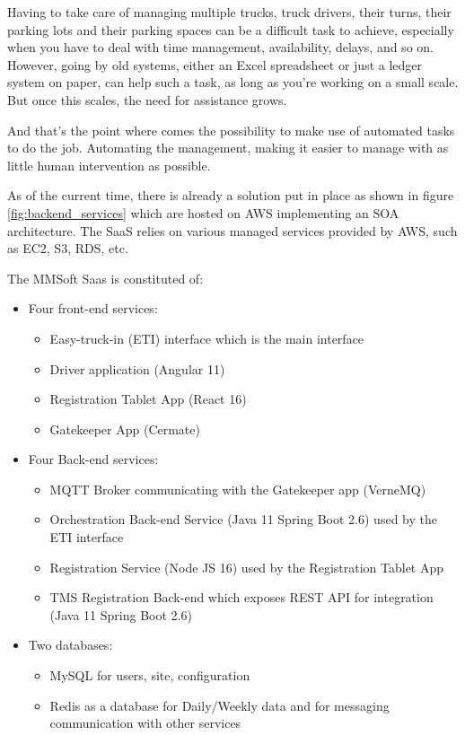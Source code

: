 Having to take care of managing multiple trucks, truck drivers, their turns, their parking lots
and their parking spaces can be a difficult task to achieve, especially when you have to deal with
time management, availability, delays, and so on.
However, going by old systems, either an Excel spreadsheet or just a ledger system on
paper, can help such a task, as long as you're working on a small scale. But once
this scales, the need for assistance grows.

And that's the point where comes the possibility to make use of automated tasks to do the job.
Automating the management, making it easier to manage with as little human intervention
as possible.

As of the current time, there is already a solution put in place as shown in figure
\ref{fig:backend_services} which are hosted  on AWS implementing an SOA architecture.
The SaaS relies on various managed services provided by AWS, such as EC2, S3, RDS, etc.

The MMSoft Saas is constituted of:
\begin{itemize}
    \item Four front-end services:
    \begin{itemize}
        \item Easy-truck-in (ETI) interface which is the main interface
        \item Driver application (Angular 11)
        \item Registration Tablet App (React 16)
        \item Gatekeeper App (Cermate)
    \end{itemize}
    \item Four Back-end services:
    \begin{itemize}
        \item MQTT Broker communicating with the Gatekeeper app (VerneMQ)
        \item Orchestration Back-end Service (Java 11 Spring Boot 2.6) used by the ETI interface
        \item Registration Service (Node JS 16) used by the Registration Tablet App
        \item TMS Registration Back-end which exposes REST API for integration (Java 11 Spring Boot 2.6)
    \end{itemize}
    \item Two databases:
    \begin{itemize}
        \item MySQL for users, site, configuration
        \item Redis as a database for Daily/Weekly data and for messaging communication with other services
    \end{itemize}
\end{itemize}

